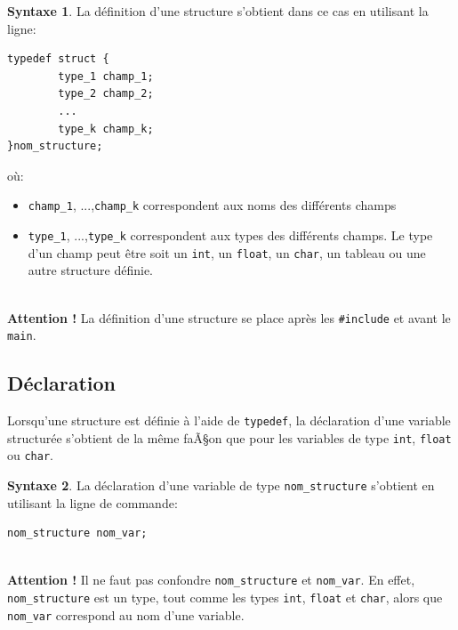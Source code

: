 \documentclass[a4paper,11pt]{book}
\newenvironment{warning} 
   {~\\ \textbf{Attention !}}{\\}
\theoremstyle{definition}
\newtheorem*{syntaxe}{Syntaxe}
\begin{document}
\begin{syntaxe}La définition d'une structure s'obtient dans ce cas en utilisant la ligne:
\begin{lstlisting}
typedef struct {
        type_1 champ_1;
        type_2 champ_2;
        ...
        type_k champ_k;
}nom_structure;
\end{lstlisting}
où:
\begin{itemize}
\item \texttt{champ\_1}, ...,\texttt{champ\_k} correspondent aux noms des différents champs
\item \texttt{type\_1}, ...,\texttt{type\_k} correspondent aux types des différents champs.  Le type d'un champ peut être soit un \texttt{int}, un \texttt{float}, un \texttt{char}, un tableau ou une autre structure définie.
\end{itemize}
\end{syntaxe}

\begin{warning}
La définition d'une structure se place après les \texttt{\#include} et avant le \texttt{main}.
\end{warning}


\subsection{Déclaration}\label{decla_struct}
Lorsqu'une structure est définie à l'aide de \texttt{typedef}, la déclaration d'une variable structurée s'obtient de la même faÃ§on que pour les variables de type \texttt{int}, \texttt{float} ou \texttt{char}.
\begin{syntaxe}La déclaration d'une variable de type \texttt{nom\_structure} s'obtient en utilisant la ligne de commande:
\begin{lstlisting}
nom_structure nom_var;
\end{lstlisting}
\end{syntaxe}

\begin{warning}
Il ne faut pas confondre  \texttt{nom\_structure} et \texttt{nom\_var}. En effet,  \texttt{nom\_structure} est un type, tout comme les types \texttt{int}, \texttt{float} et \texttt{char}, alors que \texttt{nom\_var} correspond au nom d'une variable.
\end{warning}
\end{document}
